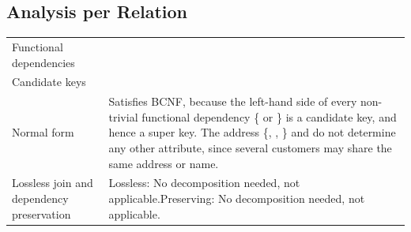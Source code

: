 \subsection{Analysis per Relation}
\label{sec:fd-detail}

\begin{xltabular}{\linewidth}{@{}KY@{}}
Functional dependencies & \begin{points}
  \item {}
  \item {}
  \item {}
  \item {}
  \item {}
  \item {}
\end{points} \\
Candidate keys & \begin{points}
  \item {}
  \item {}
\end{points} \\
Normal form & Satisfies BCNF, because the left-hand side of every non-trivial functional dependency \{ or \} is a candidate key, and hence a super key. The address \{, , \} and  do not determine any other attribute, since several customers may share the same address or name. \\
Lossless join and dependency preservation & Lossless: No decomposition needed, not applicable.\newline Preserving: No decomposition needed, not applicable. \\
\bottomrule
\end{xltabular}

